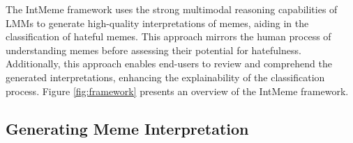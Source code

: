 
The \textsf{IntMeme} framework uses the strong multimodal reasoning capabilities of LMMs to generate high-quality interpretations of memes, aiding in the classification of hateful memes. This approach mirrors the human process of understanding memes before assessing their potential for hatefulness. Additionally, this approach enables end-users to review and comprehend the generated interpretations, enhancing the explainability of the classification process. Figure \ref{fig:framework} presents an overview of the \textsf{IntMeme} framework.


\subsection{Generating Meme Interpretation}

